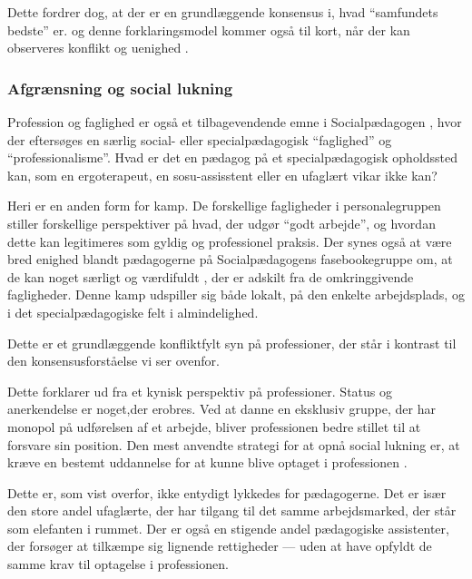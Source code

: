 Dette fordrer dog, at der er en grundlæggende konsensus i, hvad “samfundets bedste” er. og denne forklaringsmodel kommer også til kort, når der kan observeres konflikt og uenighed \autocite{frederiksenVelfaerdsprofessionerMellemOmsorg2017}.

\subsubsection{Afgrænsning og social lukning}

Profession og faglighed er også et tilbagevendende emne i Socialpædagogen \autocite[fx]{petersenHvadSigerEksperten2019}, hvor der eftersøges en særlig social- eller specialpædagogisk “faglighed” og “professionalisme”.
Hvad er det en pædagog på et specialpædagogisk opholdssted kan, som en ergoterapeut, en sosu-assisstent eller en ufaglært vikar ikke kan?

Heri er en anden form for kamp.
De forskellige fagligheder i personalegruppen stiller forskellige perspektiver på hvad, der udgør “godt arbejde”, og hvordan dette kan legitimeres som gyldig og professionel praksis.
Der synes også at være bred enighed blandt pædagogerne på Socialpædagogens fasebookegruppe om, at de kan noget særligt og værdifuldt \autocite{petersenSlagsMenneskeligAltmuligmand2019}, der er adskilt fra de omkringgivende fagligheder.
Denne kamp udspiller sig både lokalt, på den enkelte arbejdsplads, og i det specialpædagogiske felt i almindelighed.

Dette er et grundlæggende konfliktfylt syn på professioner, der står i kontrast til den konsensusforståelse vi ser ovenfor.

Dette forklarer \citeauthor{frederiksenVelfaerdsprofessionerMellemOmsorg2017} ud fra et kynisk perspektiv på professioner.
Status og anerkendelse er noget,der erobres.
Ved at danne en eksklusiv gruppe, der har monopol på udførelsen af et arbejde, bliver professionen bedre stillet til at forsvare sin position.
Den mest anvendte strategi for at opnå social lukning er, at kræve en bestemt uddannelse for at kunne blive optaget i professionen \autocite[s. 451ff]{frederiksenVelfaerdsprofessionerMellemOmsorg2017}.

Dette er, som vist overfor, ikke entydigt lykkedes for pædagogerne.
Det er især den store andel ufaglærte, der har tilgang til det samme arbejdsmarked, der står som elefanten i rummet.
Der er også en stigende andel pædagogiske assistenter, der forsøger at tilkæmpe sig lignende rettigheder — uden at have opfyldt de samme krav til optagelse i professionen.

